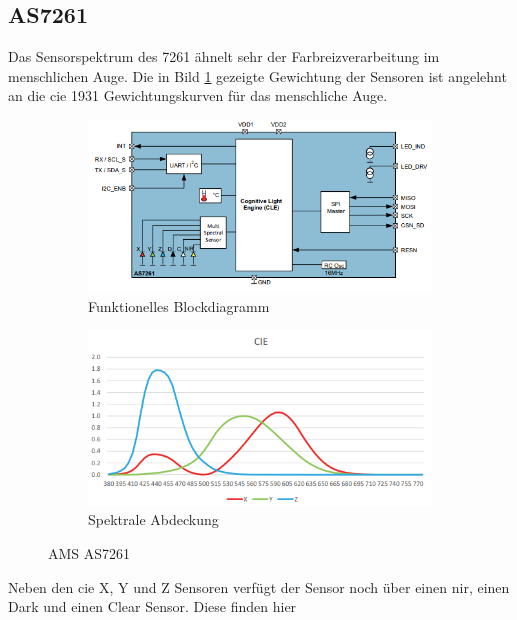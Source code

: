 \documentclass[11pt]{scrartcl}
\begin{document}
\subsection{AS7261}
Das Sensorspektrum des 7261 ähnelt sehr der Farbreizverarbeitung im menschlichen Auge. Die in Bild \ref{fig:AS7261_spectrum} gezeigte
Gewichtung der Sensoren ist angelehnt an die \ac{cie} 1931 Gewichtungskurven für das menschliche Auge.
\begin{figure}[H]
    \centering
    \begin{subfigure}[b]{0.49\textwidth}
        \includegraphics[width=\textwidth]{images/AS7261_functional_blockdiagram.png}
        \caption{Funktionelles Blockdiagramm}
    \end{subfigure}
    \hfill 
    \begin{subfigure}[b]{0.49\textwidth}
        \includegraphics[width=\textwidth]{images/AS7261_spectrum.png}
        \caption{Spektrale Abdeckung}\label{fig:AS7261_spectrum}
    \end{subfigure}
    \caption{AMS AS7261 \cite{datasheet61}}\label{fig:AS7261}
\end{figure}
\noindent
Neben den \ac{cie} X, Y und Z Sensoren verfügt der Sensor noch über einen \ac{nir}, einen Dark und einen Clear Sensor. Diese finden hier
\end{document}
